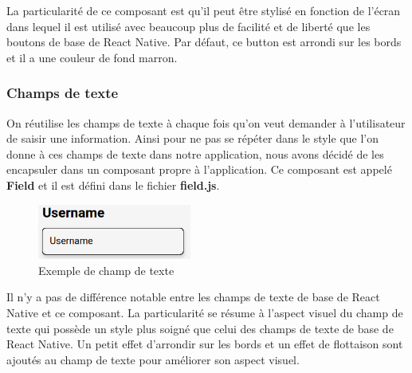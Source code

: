 \documentclass[12pt]{article}
\begin{document}
        La particularité de ce composant est qu'il peut être stylisé en fonction de l'écran dans lequel il est utilisé avec
        beaucoup plus de facilité et de liberté que les boutons de base de React Native. Par défaut, ce button
        est arrondi sur les bords et il a une couleur de fond marron.

        \subsubsection{Champs de texte}\label{subsubsec:champs-de-texte}
        On réutilise les champs de texte à chaque fois qu'on veut demander à l'utilisateur de saisir une information.
        Ainsi pour ne pas se répéter dans le style que l'on donne à ces champs de texte dans notre application, nous avons
        décidé de les encapsuler dans un composant propre à l'application. Ce composant est appelé \textbf{Field}
        et il est défini dans le fichier \textbf{field.js}.\\
        \begin{figure}[H]
            \centering
            \includegraphics[width=0.45\textwidth]{images/field}
            \caption{Exemple de champ de texte}
            \label{fig:field}
        \end{figure}
        Il n'y a pas de différence notable entre les champs de texte de base de React Native et ce composant. La particularité
        se résume à l'aspect visuel du champ de texte qui possède un style plus soigné que celui des champs de texte de base de React Native.
        Un petit effet d'arrondir sur les bords et un effet de flottaison sont ajoutés au champ de texte pour améliorer son aspect visuel.
\end{document}
